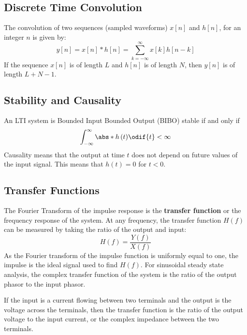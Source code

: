 \documentclass{article}
\begin{document}
\subsection{Discrete Time Convolution}
The convolution of two sequences (sampled waveforms) \(x\left[ n
\right]\) and \(h\left[ n \right]\), for an integer \(n\) is given by:
\begin{equation*}
    y\left[ n \right] = x\left[ n \right] \ast h\left[ n \right] = \sum_{k = -\infty}^\infty x\left[ k \right] h\left[ n - k \right]
\end{equation*}
If the sequence \(x\left[ n \right]\) is of length \(L\) and \(h\left[ n \right]\) is of length \(N\),
then \(y\left[ n \right]\) is of length \(L + N - 1\).
\subsection{Stability and Causality}
An LTI system is Bounded Input Bounded Output (BIBO) stable if and only
if
\begin{equation*}
    \int_{-\infty}^\infty \abs*{h\left( t \right)} \odif{t} < \infty
\end{equation*}
Causality means that the output at time \(t\) does not depend on future values of the input signal.
This means that \(h\left( t \right) = 0\) for \(t < 0\).
\subsection{Transfer Functions}
The Fourier Transform of the impulse response is the \textbf{transfer
function} or the frequency response of the system. At any frequency,
the transfer function \(H\left( f \right)\) can be measured by taking
the ratio of the output and input:
\begin{equation*}
    H\left( f \right) = \frac{Y\left( f \right)}{X\left( f \right)}
\end{equation*}
As the Fourier transform of the impulse function is uniformly equal to one, the
impulse is the ideal signal used to find \(H\left( f \right)\).
For sinusoidal steady state analysis, the complex transfer function of the system is the ratio of the
output phasor to the input phasor.

If the input is a current flowing between two terminals and the output
is the voltage across the terminals, then the transfer function is the
ratio of the output voltage to the input current, or the complex
impedance between the two terminals.
\end{document}
